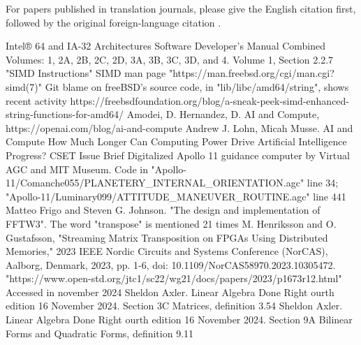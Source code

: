 \documentclass[conference]{IEEEtran}
\begin{document}
For papers published in translation journals, please give the English 
citation first, followed by the original foreign-language citation \cite{b6}.

\begin{thebibliography}{00}
 Intel® 64 and IA-32 Architectures Software Developer’s Manual Combined Volumes: 1, 2A, 2B, 2C, 2D, 3A, 3B, 3C, 3D, and 4. Volume 1, Section 2.2.7 "SIMD Instructions"
 SIMD man page "https://man.freebsd.org/cgi/man.cgi?simd(7)"
 Git blame on freeBSD's source code, in "lib/libc/amd64/string", shows recent activity
 https://freebsdfoundation.org/blog/a-sneak-peek-simd-enhanced-string-functions-for-amd64/
 Amodei, D. Hernandez, D. AI and Compute, https://openai.com/blog/ai-and-compute
 Andrew J. Lohn, Micah Musse. AI and Compute How Much Longer Can Computing Power Drive Artificial Intelligence Progress? CSET Issue Brief
 Digitalized Apollo 11 guidance computer by Virtual AGC and MIT Museum. Code in "Apollo-11/Comanche055/PLANETERY\_INTERNAL\_ORIENTATION.agc" line 34; "Apollo-11/Luminary099/ATTITUDE\_MANEUVER\_ROUTINE.agc" line 441
 Matteo Frigo and Steven G. Johnson. "The design and implementation of FFTW3". The word "transpose" is mentioned 21 times
 M. Henriksson and O. Gustafsson, "Streaming Matrix Transposition on FPGAs Using Distributed Memories," 2023 IEEE Nordic Circuits and Systems Conference (NorCAS), Aalborg, Denmark, 2023, pp. 1-6, doi: 10.1109/NorCAS58970.2023.10305472.
 "https://www.open-std.org/jtc1/sc22/wg21/docs/papers/2023/p1673r12.html" Accessed in november 2024
 Sheldon Axler. Linear Algebra Done Right ourth edition
16 November 2024. Section 3C Matrices, definition 3.54
 Sheldon Axler. Linear Algebra Done Right ourth edition
16 November 2024. Section 9A Bilinear Forms and Quadratic Forms, definition 9.11


\end{thebibliography}
\vspace{12pt}
\end{document}

